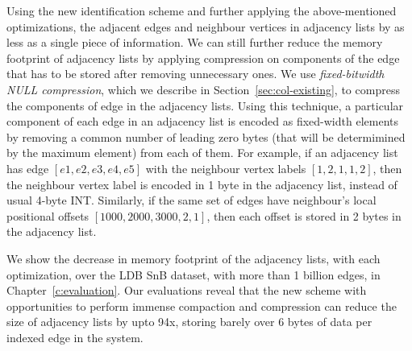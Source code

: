 Using the new identification scheme and further applying the above-mentioned optimizations, the adjacent edges and neighbour vertices in adjacency lists by as less as a single piece of information. We can still further reduce the memory footprint of adjacency lists by applying compression on components of the edge that has to be stored after removing unnecessary ones. We use \emph{fixed-bitwidth NULL compression}, which we describe in Section~\ref{sec:col-existing}, to compress the components of edge in the adjacency lists. Using this technique, a particular component of each edge in an adjacency list is encoded as fixed-width elements by removing a common number of leading zero bytes (that will be determimined by the maximum element) from each of them. For example, if an adjacency list has edge $[e1, e2, e3, e4, e5]$ with the neighbour vertex labels $[1, 2, 1, 1, 2]$, then the neighbour vertex label is encoded in 1 byte in the adjacency list, instead of usual 4-byte INT. Similarly, if the same set of edges have neighbour's local positional offsets $[1000, 2000, 3000, 2, 1]$, then each offset is stored in 2 bytes in the adjacency list.

We show the decrease in memory footprint of the adjacency lists, with each optimization, over the LDB SnB dataset, with more than 1 billion edges, in Chapter~\ref{c:evaluation}. Our evaluations reveal that the new scheme with opportunities to perform immense compaction and compression can reduce the size of adjacency lists by upto 94x, storing barely over 6 bytes of data per indexed edge in the system.

